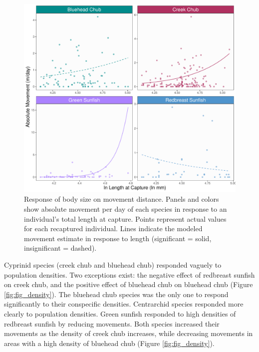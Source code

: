 \documentclass[11pt, class=article, crop=false]{standalone}
\begin{document}
\begin{figure}
    \centering
    \includegraphics[width=0.75\linewidth]{output/fig_size.pdf}
    \caption{Response of body size on movement distance. Panels and colors show absolute movement per day of each species in response to an individual's total length at capture. Points represent actual values for each recaptured individual. Lines indicate the modeled movement estimate in response to length (significant = solid, insignificant = dashed).}
    \label{fig:fig_size}
\end{figure}
Cyprinid species (creek chub and bluehead chub) responded vaguely to population densities. Two exceptions exist: the negative effect of redbreast sunfish on creek chub, and the positive effect of bluehead chub on bluehead chub (Figure \ref{fig:fig_density}). The bluehead chub species was the only one to respond significantly to their conspecific densities. Centrarchid species responded more clearly to population densities. Green sunfish responded to high densities of redbreast sunfish by reducing movements. Both species increased their movements as the density of creek chub increases, while decreasing movements in areas with a high density of bluehead chub (Figure \ref{fig:fig_density}).
\end{document}
